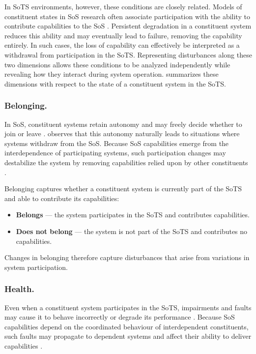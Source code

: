 In SoTS environments, however, these conditions are closely related. Models of constituent states in SoS research often associate participation with the ability to contribute capabilities to the SoS \cite{axelsson2019refined}. Persistent degradation in a constituent system reduces this ability and may eventually lead to failure, removing the capability entirely. In such cases, the loss of capability can effectively be interpreted as a withdrawal from participation in the SoTS. Representing disturbances along these two dimensions allows these conditions to be analyzed independently while revealing how they interact during system operation.  summarizes these dimensions with respect to the state of a constituent system in the SoTS.



\subsubsection{Belonging.}
In SoS, constituent systems retain autonomy and may freely decide whether to join or leave \cite{boardman2006system, baldwin2011formation}. \citet{salado2015abandonment} observes that this autonomy naturally leads to situations where systems withdraw from the SoS. Because SoS capabilities emerge from the interdependence of participating systems, such participation changes may destabilize the system by removing capabilities relied upon by other constituents \cite{salado2016exile}.

Belonging captures whether a constituent system is currently part of the SoTS and able to contribute its capabilities:

\begin{itemize}
    \item \textbf{Belongs} --- the system participates in the SoTS and contributes capabilities.
    \item \textbf{Does not belong} --- the system is not part of the SoTS and contributes no capabilities.
\end{itemize}

Changes in belonging therefore capture disturbances that arise from variations in system participation.

\subsubsection{Health.}
Even when a constituent system participates in the SoTS, impairments and faults may cause it to behave incorrectly or degrade its performance \cite{abbott1990resourceful}. Because SoS capabilities depend on the coordinated behaviour of interdependent constituents, such faults may propagate to dependent systems and affect their ability to deliver capabilities \cite{ferreira2024framework,avizienis2004basic}.

